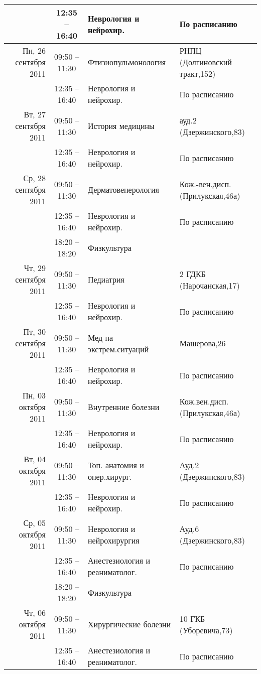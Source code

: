 \documentclass[a4paper,10pt,notitlepage]{report}
\begin{document}
\begin{center}
{\begin{longtable}{r|c|l|l|}
  & 12:35 -- 16:40 & Неврология и нейрохир. & По расписанию \\ \cline{2-4}
\hline Пн, 26 сентября 2011
  & 09:50 -- 11:30 & Фтизиопульмонология & РНПЦ (Долгиновский тракт,152) \\ \cline{2-4}
  & 12:35 -- 16:40 & Неврология и нейрохир. & По расписанию \\ \cline{2-4}
\hline Вт, 27 сентября 2011
  & 09:50 -- 11:30 & История медицины & ауд.2 (Дзержинского,83) \\ \cline{2-4}
  & 12:35 -- 16:40 & Неврология и нейрохир. & По расписанию \\ \cline{2-4}
\hline Ср, 28 сентября 2011
  & 09:50 -- 11:30 & Дерматовенерология & Кож.-вен.дисп.(Прилукская,46а) \\ \cline{2-4}
  & 12:35 -- 16:40 & Неврология и нейрохир. & По расписанию \\ \cline{2-4}
  & 18:20 -- 18:20 & Физкультура &  \\ \cline{2-4}
\hline Чт, 29 сентября 2011
  & 09:50 -- 11:30 & Педиатрия & 2 ГДКБ (Нарочанская,17) \\ \cline{2-4}
  & 12:35 -- 16:40 & Неврология и нейрохир. & По расписанию \\ \cline{2-4}
\hline Пт, 30 сентября 2011
  & 09:50 -- 11:30 & Мед-на экстрем.ситуаций & Машерова,26 \\ \cline{2-4}
  & 12:35 -- 16:40 & Неврология и нейрохир. & По расписанию \\ \cline{2-4}
\hline Пн, 03 октября 2011
  & 09:50 -- 11:30 & Внутренние болезни & Кож.вен.дисп.(Прилукская,46а) \\ \cline{2-4}
  & 12:35 -- 16:40 & Неврология и нейрохир. & По расписанию \\ \cline{2-4}
\hline Вт, 04 октября 2011
  & 09:50 -- 11:30 & Топ. анатомия и опер.хирург. & Ауд.2 (Дзержинского,83) \\ \cline{2-4}
  & 12:35 -- 16:40 & Неврология и нейрохир. & По расписанию \\ \cline{2-4}
\hline Ср, 05 октября 2011
  & 09:50 -- 11:30 & Неврология и нейрохирургия & Ауд.6 (Дзержинского,83) \\ \cline{2-4}
  & 12:35 -- 16:40 & Анестезиология и реаниматолог. & По расписанию \\ \cline{2-4}
  & 18:20 -- 18:20 & Физкультура &  \\ \cline{2-4}
\hline Чт, 06 октября 2011
  & 09:50 -- 11:30 & Хирургические болезни & 10 ГКБ (Уборевича,73) \\ \cline{2-4}
  & 12:35 -- 16:40 & Анестезиология и реаниматолог. & По расписанию \\ \cline{2-4}

\end{longtable}}
\end{center}
\end{document}
